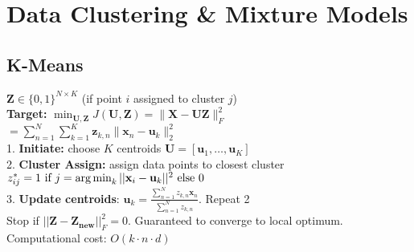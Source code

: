 \section*{Data Clustering \& Mixture Models}
\subsection*{K-Means}
$\mathbf{Z} \in \{0,1\}^{N\times K}$ (if point $i$ assigned to cluster $j$) \\
\textbf{Target:} $\min_{\mathbf{U}, \mathbf{Z}} J(\mathbf{U}, \mathbf{Z}) = \|\mathbf{X} - \mathbf{U} \mathbf{Z}\|_F^2$\\
$= \sum_{n=1}^N \sum_{k=1}^K \mathbf{z}_{k,n} \|\mathbf{x}_n - \mathbf{u}_k\|_2^2$\\
1. \textbf{Initiate:} choose $K$ centroids $\mathbf{U} = [\mathbf{u}_1, \ldots, \mathbf{u}_K]$\\
2. \textbf{Cluster Assign:} assign data points to closest cluster  $z_{ij}^* = 1 \text{ if } j=\operatorname*{arg\,min}_k||\mathbf{x}_i - \mathbf{u}_k||^2 \text{ else } 0$\\
3. \textbf{Update centroids}: $\mathbf{u}_k = \frac{\sum_{n=1}^N z_{k,n} \mathbf{x}_n}{\sum_{n=1}^N z_{k,n}}$. Repeat 2\\
Stop if $||\mathbf{Z} - \mathbf{Z_{new}}||_F^2 = 0$. 
Guaranteed to converge to local optimum.
Computational cost: $O(k\cdot n \cdot d)$
